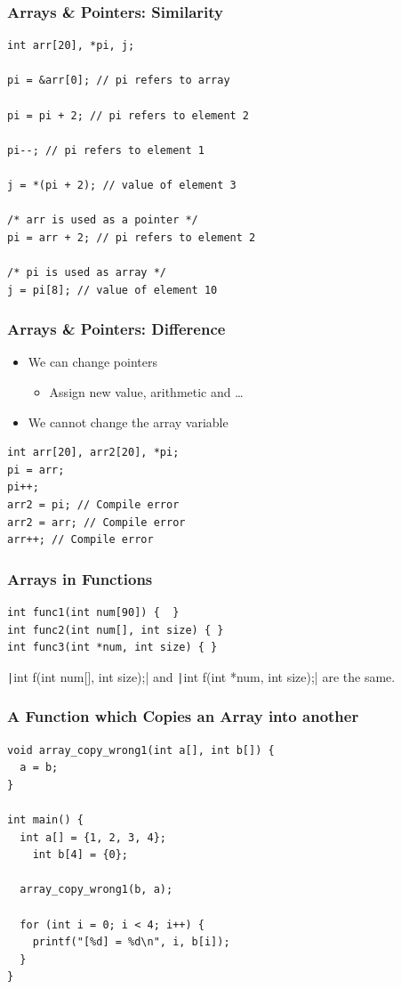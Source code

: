 \documentclass{../c-lecture}
\begin{document}
\begin{frame}[fragile]
  \frametitle{Arrays \& Pointers: Similarity}
  \begin{verbatim}
int arr[20], *pi, j;

pi = &arr[0]; // pi refers to array

pi = pi + 2; // pi refers to element 2

pi--; // pi refers to element 1

j = *(pi + 2); // value of element 3

/* arr is used as a pointer */
pi = arr + 2; // pi refers to element 2

/* pi is used as array */
j = pi[8]; // value of element 10
  \end{verbatim}
\end{frame}

\begin{frame}[fragile]
  \frametitle{Arrays \& Pointers: Difference}
  \begin{itemize}
    \item We can change pointers
    \begin{itemize}
      \item Assign new value, arithmetic and \ldots
    \end{itemize}
    \item We cannot change the array variable
  \end{itemize}
  \begin{verbatim}
int arr[20], arr2[20], *pi;
pi = arr;
pi++;
arr2 = pi; // Compile error
arr2 = arr; // Compile error
arr++; // Compile error
  \end{verbatim}
\end{frame}

\begin{frame}[fragile]
  \frametitle{Arrays in Functions}
  \begin{verbatim}
int func1(int num[90]) {  }
int func2(int num[], int size) { }
int func3(int *num, int size) { }
  \end{verbatim}
  \begin{block}{}
    \texttt|int f(int num[], int size);|
    and
    \texttt|int f(int *num, int size);|
    are the same.
  \end{block}
\end{frame}

\begin{frame}[fragile]
  \frametitle{A Function which Copies an Array into another}
  \begin{verbatim}
void array_copy_wrong1(int a[], int b[]) {
  a = b;
}

int main() {
  int a[] = {1, 2, 3, 4};
	int b[4] = {0};

  array_copy_wrong1(b, a);

  for (int i = 0; i < 4; i++) {
    printf("[%d] = %d\n", i, b[i]);
  }
}
  \end{verbatim}
\end{frame}
\end{document}
